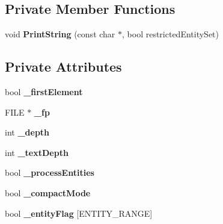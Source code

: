\subsection*{Private Member Functions}
\begin{DoxyCompactItemize}
\item 
void {\bfseries Print\+String} (const char $\ast$, bool restricted\+Entity\+Set)\hypertarget{classtinyxml2_1_1_x_m_l_printer_a5495e504053f63f2c4d603327314fa91}{}\label{classtinyxml2_1_1_x_m_l_printer_a5495e504053f63f2c4d603327314fa91}

\end{DoxyCompactItemize}
\subsection*{Private Attributes}
\begin{DoxyCompactItemize}
\item 
bool {\bfseries \+\_\+first\+Element}\hypertarget{classtinyxml2_1_1_x_m_l_printer_abbd7ac45d97ae5eceec12d6c058119f9}{}\label{classtinyxml2_1_1_x_m_l_printer_abbd7ac45d97ae5eceec12d6c058119f9}

\item 
F\+I\+LE $\ast$ {\bfseries \+\_\+fp}\hypertarget{classtinyxml2_1_1_x_m_l_printer_a79d91decf17990f7ce18b592f3fdf44e}{}\label{classtinyxml2_1_1_x_m_l_printer_a79d91decf17990f7ce18b592f3fdf44e}

\item 
int {\bfseries \+\_\+depth}\hypertarget{classtinyxml2_1_1_x_m_l_printer_a19cd59a9dbe4b666264803fb91ac8ec1}{}\label{classtinyxml2_1_1_x_m_l_printer_a19cd59a9dbe4b666264803fb91ac8ec1}

\item 
int {\bfseries \+\_\+text\+Depth}\hypertarget{classtinyxml2_1_1_x_m_l_printer_a3c5a442e57131faefde97188e92144f3}{}\label{classtinyxml2_1_1_x_m_l_printer_a3c5a442e57131faefde97188e92144f3}

\item 
bool {\bfseries \+\_\+process\+Entities}\hypertarget{classtinyxml2_1_1_x_m_l_printer_a3e27c4b4fe791a96e4e139b5034e190b}{}\label{classtinyxml2_1_1_x_m_l_printer_a3e27c4b4fe791a96e4e139b5034e190b}

\item 
bool {\bfseries \+\_\+compact\+Mode}\hypertarget{classtinyxml2_1_1_x_m_l_printer_a7bc067aa3f0dcee68e4ac75e19117bd0}{}\label{classtinyxml2_1_1_x_m_l_printer_a7bc067aa3f0dcee68e4ac75e19117bd0}

\item 
bool {\bfseries \+\_\+entity\+Flag} \mbox{[}E\+N\+T\+I\+T\+Y\+\_\+\+R\+A\+N\+GE\mbox{]}\hypertarget{classtinyxml2_1_1_x_m_l_printer_a334eb34c43f21daebef9341b4768c275}{}\label{classtinyxml2_1_1_x_m_l_printer_a334eb34c43f21daebef9341b4768c275}


\end{DoxyCompactItemize}
